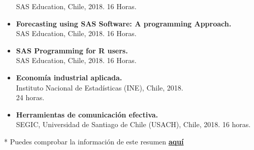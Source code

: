 \documentclass[10pt,a4paper,ragged2e,withhyper,academicons]{altacv}
\begin{document}
\begin{paracol}{2}
\begin{itemize}
	SAS Education, Chile, 2018. 16 Horas.
	\item \textbf{Forecasting using SAS Software: A programming Approach.} \\
	SAS Education, Chile, 2018. 16 Horas.
	\item \textbf{SAS Programming for R users.} \\
	SAS Education, Chile, 2018. 16 Horas.
	\item \textbf{Econom\'ia industrial aplicada.} \\
	Instituto Nacional de Estad\'isticas (INE), Chile, 2018.\\ 24 horas.
	\item \textbf{Herramientas de comunicaci\'on efectiva.} \\
	SEGIC, Universidad de Santiago de Chile (USACH), Chile, 2018. 16 horas.
\end{itemize}
\bigskip
\bigskip
* Puedes comprobar la informaci\'on de este resumen  \href{https://drive.google.com/drive/folders/1u0bYbx0pKRGKShkCB766mANb5ZWrbCzI?}{\textbf{\color{DodgerBlue} aqu\'i}}	







\end{paracol}
\end{document}
